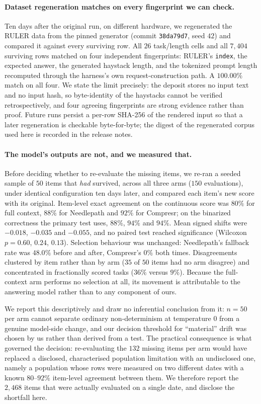 \documentclass[11pt]{article}
\newcommand{\NP}{Needlepath}
\begin{document}
\paragraph{Dataset regeneration matches on every fingerprint we can check.} Ten days after the original run, on different
hardware, we regenerated the RULER data from the pinned generator (commit
\texttt{38da79d7}, seed $42$) and compared it against every surviving row. All $26$ task/length
cells and all $7{,}404$ surviving rows matched on four independent fingerprints: RULER's
\texttt{index}, the expected answer, the generated haystack length, and the tokenized prompt
length recomputed through the harness's own request-construction path. A $100.00\%$ match on all
four. We state the limit precisely: the deposit stores no input text and no input hash, so
byte-identity of the haystacks cannot be verified retrospectively, and four agreeing fingerprints
are strong evidence rather than proof. Future runs persist a per-row SHA-256 of the rendered
input so that a later regeneration is checkable byte-for-byte; the digest of the regenerated
corpus used here is recorded in the release notes.

\paragraph{The model's outputs are not, and we measured that.} Before deciding whether to
re-evaluate the missing items, we re-ran a seeded sample of $50$ items that \emph{had} survived,
across all three arms ($150$ evaluations), under identical configuration ten days later, and
compared each item's new score with its original. Item-level exact agreement on the continuous
score was $80\%$ for full context, $88\%$ for \NP{} and $92\%$ for Compresr; on the binarized
correctness the primary test uses, $88\%$, $94\%$ and $94\%$. Mean signed shifts were
$-0.018$, $-0.035$ and $-0.055$, and no paired test reached significance (Wilcoxon $p{=}0.60$,
$0.24$, $0.13$). Selection behaviour was unchanged: \NP{}'s fallback rate was $48.0\%$ before and
after, Compresr's $0\%$ both times. Disagreements clustered by item rather than by arm ($35$ of
$50$ items had no arm disagree) and concentrated in fractionally scored tasks ($36\%$ versus
$9\%$). Because the full-context arm performs no selection at all, its movement is attributable
to the answering model rather than to any component of ours.

We report this descriptively and draw no inferential conclusion from it: $n{=}50$ per arm cannot
separate ordinary non-determinism at temperature $0$ from a genuine model-side change, and our
decision threshold for ``material'' drift was chosen by us rather than derived from a test. The
practical consequence is what governed the decision: re-evaluating the $132$ missing items per
arm would have replaced a disclosed, characterised population limitation with an undisclosed
one, namely a population whose rows were measured on two different dates with a known $80$--$92\%$
item-level agreement between them. We therefore report the $2{,}468$ items that were actually
evaluated on a single date, and disclose the shortfall here.
\end{document}
